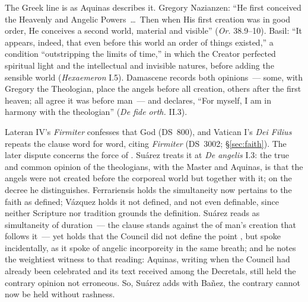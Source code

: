 The Greek line is as Aquinas describes it. Gregory Nazianzen:
``He first conceived the Heavenly and Angelic Powers~\dots\ Then when His
first creation was in good order, He conceives a second world, material
and visible'' (\emph{Or.} 38.9--10). Basil: ``It appears, indeed, that
even before this world an order of things existed,'' a condition
``outstripping the limits of time,'' in which the Creator perfected
spiritual light and the intellectual and invisible natures, before adding
the sensible world (\emph{Hexaemeron} I.5). Damascene records both
opinions~--- some, with Gregory the Theologian, place the angels before
all creation, others after the first heaven; all agree it was before man~---
and declares, ``For myself, I am in harmony with the theologian''
(\emph{De fide orth.} II.3).

Lateran IV's \emph{Firmiter} confesses that God  (DS~800), and
Vatican I's \emph{Dei Filius} repeats the clause word for word, citing
\emph{Firmiter} (DS~3002; \S\ref{sec:faith}). The later dispute concerns
the force of . Suárez treats it at \emph{De angelis} I.3:
the true and common opinion of the theologians, with the Master and
Aquinas, is that the angels were not created before the corporeal world
but together with it; on the decree he distinguishes. Ferrariensis holds
the simultaneity now pertains to the faith as defined; Vázquez holds it
not defined, and not even definable, since neither Scripture nor
tradition grounds the definition. Suárez reads  as
simultaneity of duration~--- the clause stands against the 
of man's creation that follows it~--- yet holds that the Council did not
define the point , but spoke incidentally, as it
spoke of angelic incorporeity in the same breath; and he notes the
weightiest witness to that reading: Aquinas, writing when the Council had
already been celebrated and its text received among the Decretals, still
held the contrary opinion not erroneous. So, Suárez adds with Bañez, the
contrary cannot now be held without rashness.

